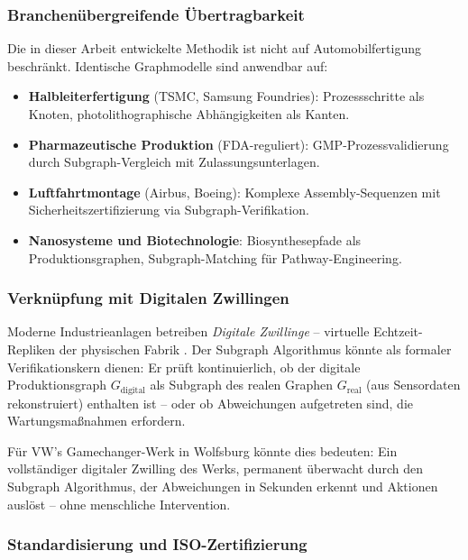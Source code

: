 ﻿\documentclass[a4paper,12pt]{article}
\theoremstyle{definition}
\begin{document}
\subsubsection{Branchenübergreifende Übertragbarkeit}

Die in dieser Arbeit entwickelte Methodik ist nicht auf Automobilfertigung beschränkt.
Identische Graphmodelle sind anwendbar auf:
\begin{itemize}
\item \textbf{Halbleiterfertigung} (TSMC, Samsung Foundries): Prozessschritte als Knoten,
  photolithographische Abhängigkeiten als Kanten.
\item \textbf{Pharmazeutische Produktion} (FDA-reguliert): GMP-Prozessvalidierung durch
  Subgraph-Vergleich mit Zulassungsunterlagen.
\item \textbf{Luftfahrtmontage} (Airbus, Boeing): Komplexe Assembly-Sequenzen mit
  Sicherheitszertifizierung via Subgraph-Verifikation.
\item \textbf{Nanosysteme und Biotechnologie}: Biosynthesepfade als Produktionsgraphen,
  Subgraph-Matching für Pathway-Engineering.
\end{itemize}

\subsubsection{Verknüpfung mit Digitalen Zwillingen}

Moderne Industrieanlagen betreiben \emph{Digitale Zwillinge} -- virtuelle Echtzeit-Repliken
der physischen Fabrik \cite{grieves2014digital}. Der Subgraph Algorithmus könnte als
formaler Verifikationskern dienen: Er prüft kontinuierlich, ob der digitale Produktionsgraph
$G_{\mathrm{digital}}$ als Subgraph des realen Graphen $G_{\mathrm{real}}$ (aus Sensordaten
rekonstruiert) enthalten ist -- oder ob Abweichungen aufgetreten sind, die Wartungsmaßnahmen
erfordern.

Für VW's Gamechanger-Werk in Wolfsburg könnte dies bedeuten: Ein vollständiger
digitaler Zwilling des Werks, permanent überwacht durch den Subgraph Algorithmus,
der Abweichungen in Sekunden erkennt und Aktionen auslöst -- ohne menschliche Intervention.

\subsubsection{Standardisierung und ISO-Zertifizierung}
\end{document}
